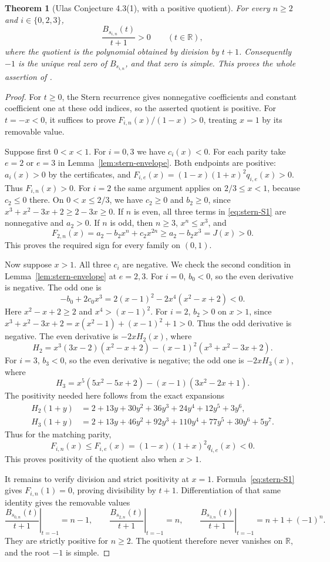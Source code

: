 \documentclass[11pt,a4paper]{article}
\newtheorem{theorem}{Theorem}[section]
\theoremstyle{definition}\newtheorem{definition}[theorem]{Definition}
\theoremstyle{remark}\newtheorem{remark}[theorem]{Remark}
\begin{document}
\begin{theorem}[Ulas Conjecture 4.3(1), with a positive quotient]
\label{thm:ulas-three-root-families}
For every $n\geq2$ and $i\in\{0,2,3\}$,
\[
 \frac{B_{s_{i,n}}(t)}{t+1}>0\qquad(t\in\mathbb R),
\]
where the quotient is the polynomial obtained by division by $t+1$.
Consequently $-1$ is the unique real zero of $B_{s_{i,n}}$, and that
zero is simple. This proves the whole assertion of
\cite[Conjecture~4.3(1)]{Ulas20}.
\end{theorem}
\begin{proof}
For $t\geq0$, the Stern recurrence gives nonnegative coefficients and
constant coefficient one at these odd indices, so the asserted quotient
is positive. For $t=-x<0$, it suffices to prove
$F_{i,n}(x)/(1-x)>0$, treating $x=1$ by its removable value.

Suppose first $0<x<1$. For $i=0,3$ we have $c_i(x)<0$. For each
parity take $e=2$ or $e=3$ in Lemma~\ref{lem:stern-envelope}.
Both endpoints are positive: $a_i(x)>0$ by the certificates, and
$F_{i,e}(x)=(1-x)(1+x)^2q_{i,e}(x)>0$. Thus $F_{i,n}(x)>0$.
For $i=2$ the same argument applies on $2/3\leq x<1$, because
$c_2\leq0$ there. On $0<x\leq2/3$, we have $c_2\geq0$ and
$b_2\geq0$, since $x^3+x^2-3x+2\geq 2-3x\geq0$.
If $n$ is even, all three terms in \eqref{eq:stern-S1} are nonnegative
and $a_2>0$. If $n$ is odd, then $n\geq3$, $x^n\leq x^3$, and
\[
 F_{2,n}(x)=a_2-b_2x^n+c_2x^{2n}\geq a_2-b_2x^3=J(x)>0.
\]
This proves the required sign for every family on $(0,1)$.

Now suppose $x>1$. All three $c_i$ are negative. We check the
second condition in Lemma~\ref{lem:stern-envelope} at $e=2,3$.
For $i=0$, $b_0<0$, so the even derivative is negative. The odd one is
\[
 -b_0+2c_0x^3=2(x-1)^2-2x^4(x^2-x+2)<0.
\]
Here $x^2-x+2\geq2$ and $x^4>(x-1)^2$.
For $i=2$, $b_2>0$ on $x>1$, since
$x^3+x^2-3x+2=x(x^2-1)+(x-1)^2+1>0$. Thus the odd derivative is negative.
The even derivative is $-2xH_2(x)$, where
\[
 H_2=x^3(3x-2)(x^2-x+2)-(x-1)^2(x^3+x^2-3x+2).
\]
For $i=3$, $b_3<0$, so the even derivative is negative; the odd
one is $-2xH_3(x)$, where
\[
 H_3=x^5(5x^2-5x+2)-(x-1)(3x^2-2x+1).
\]
The positivity needed here follows from the exact expansions
\begin{align*}
 H_2(1+y)&=2+13y+30y^2+36y^3+24y^4+12y^5+3y^6,\\
 H_3(1+y)&=2+13y+46y^2+92y^3+110y^4+77y^5+30y^6+5y^7.
\end{align*}
Thus for the matching parity,
\[
 F_{i,n}(x)\leq F_{i,e}(x)
      =(1-x)(1+x)^2q_{i,e}(x)<0.
\]
This proves positivity of the quotient also when $x>1$.

It remains to verify division and strict positivity at $x=1$.
Formula~\eqref{eq:stern-S1} gives $F_{i,n}(1)=0$, proving divisibility
by $t+1$. Differentiation of that same identity gives the removable
values
\[
 \left.\frac{B_{s_{0,n}}(t)}{t+1}\right|_{t=-1}=n-1,\qquad
 \left.\frac{B_{s_{2,n}}(t)}{t+1}\right|_{t=-1}=n,\qquad
 \left.\frac{B_{s_{3,n}}(t)}{t+1}\right|_{t=-1}=n+1+(-1)^n.
\]
They are strictly positive for $n\geq2$. The quotient therefore never
vanishes on $\mathbb R$, and the root $-1$ is simple.
\end{proof}
\end{document}

